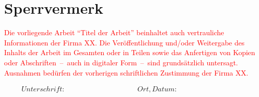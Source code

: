 \section*{Sperrvermerk}

\textcolor{red}{
Die vorliegende Arbeit \enquote{Titel der Arbeit} beinhaltet auch vertrauliche Informationen der Firma XX.
Die Veröffentlichung und/oder Weitergabe des Inhalts der Arbeit im Gesamten oder in Teilen sowie das Anfertigen von Kopien oder Abschriften~--~auch in digitaler Form~--~sind grundsätzlich untersagt.
Ausnahmen bedürfen der vorherigen schriftlichen Zustimmung der Firma XX.}

\vspace{10cm}

\begin{displaymath}
\begin{array}{ll}
Unterschrift:~~~~~~~~~~~~~~~~~~~~~~~~~~~~~~~~~~~~~~~~~~
& Ort, Datum:~~~~~~~~~~~~~~~~~~~~~~~~~~~~~~~~~~~~~~~~~~
\end{array}
\end{displaymath}



